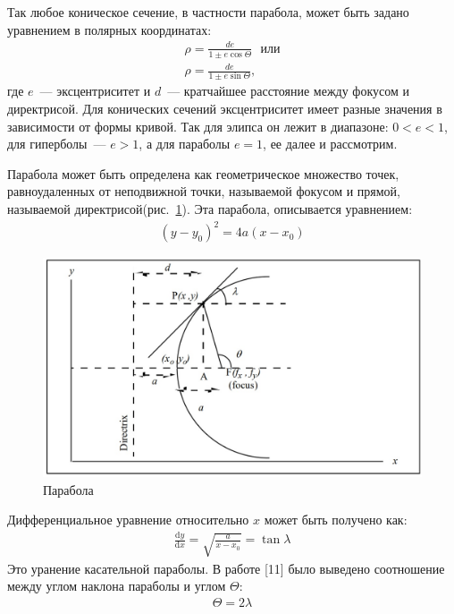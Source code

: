 \documentclass[12pt]{article} %
\begin{document}
Так любое коническое сечение, в частности парабола, может быть задано уравнением в полярных координатах:
\begin{gather}\label{conic}
	\rho = \frac{de}{1\pm e\cos{\Theta}}~~~\text{или}
	\\
	\rho = \frac{de}{1\pm e\sin{\Theta}},~~~~~~~
\end{gather}
где $e$~--- эксцентриситет и $d$~--- кратчайшее расстояние между фокусом и директрисой. Для конических сечений эксцентриситет имеет разные значения в зависимости от формы кривой. Так для элипса он лежит в диапазоне: $0<e<1$, для гиперболы~--- $e>1$, а для параболы $e = 1$, ее далее и рассмотрим.

Парабола может быть определена как геометрическое множество точек, равноудаленных от неподвижной точки, называемой фокусом и прямой, называемой директрисой(рис.~\ref{fig:hough_parab}). Эта парабола, описывается уравнением:
\begin{gather}\label{parab_equ}
	(y-y_0)^2 = 4a(x-x_0)
\end{gather}

\begin{figure}[h]
	
	\centering
	
	\includegraphics[width=0.7\linewidth]{hough_parab.jpg}
	
	\caption{Парабола}
	
	\label{fig:hough_parab}
	
\end{figure}
Дифференциальное уравнение относительно $x$ может быть получено как:
\begin{gather}\label{parab_diff}
	\frac{\text{d}y}{\text{d}x}=\sqrt{\frac{a}{x-x_0}} = \tan{\lambda}
\end{gather}
Это уранение касательной параболы. В работе [11] было выведено соотношение между углом наклона параболы и углом $\Theta$:
\begin{gather}\label{angl}
	\Theta = 2\lambda
\end{gather}
 
\end{document}
